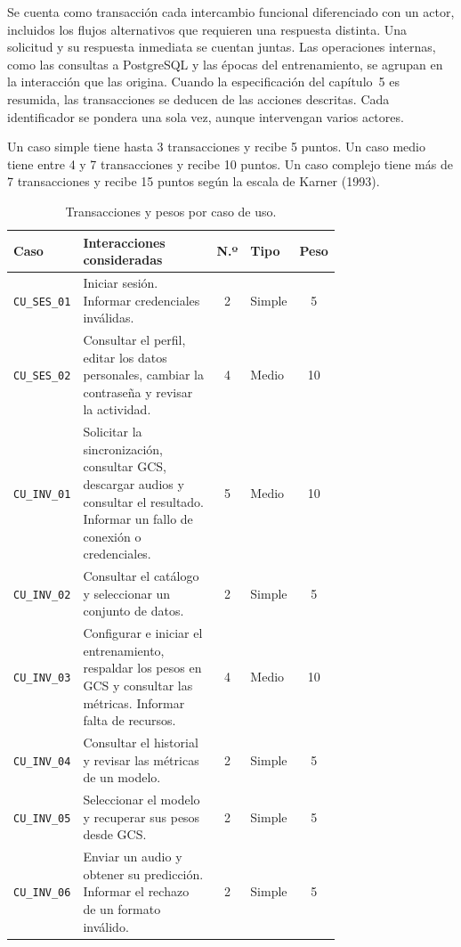 Se cuenta como transacción cada intercambio funcional diferenciado con
un actor, incluidos los flujos alternativos que requieren una respuesta
distinta. Una solicitud y su respuesta inmediata se cuentan juntas. Las
operaciones internas, como las consultas a PostgreSQL y las épocas del
entrenamiento, se agrupan en la interacción que las origina. Cuando la
especificación del capítulo~5 es resumida, las transacciones se deducen
de las acciones descritas. Cada identificador se pondera una sola vez,
aunque intervengan varios actores.

Un caso simple tiene hasta 3 transacciones y recibe 5 puntos. Un caso
medio tiene entre 4 y 7 transacciones y recibe 10 puntos. Un caso complejo
tiene más de 7 transacciones y recibe 15 puntos según la escala de
Karner (1993).

\begin{table}[!htbp]
    \centering
    \caption{Transacciones y pesos por caso de uso.}
    \label{tab:ucp-fama-casos}
    \small
    \setlength{\tabcolsep}{4pt}
    \renewcommand{\arraystretch}{1.10}
    \begin{tabular}{@{}p{0.18\linewidth}p{0.55\linewidth}clc@{}}
        \hline
        \textbf{Caso} & \textbf{Interacciones consideradas} &
        \textbf{N.º} & \textbf{Tipo} & \textbf{Peso} \\
        \hline
        \texttt{CU\_SES\_01} & Iniciar sesión. Informar credenciales inválidas. & 2 & Simple & 5 \\
        \texttt{CU\_SES\_02} & Consultar el perfil, editar los datos personales, cambiar la contraseña y revisar la actividad. & 4 & Medio & 10 \\
        \texttt{CU\_INV\_01} & Solicitar la sincronización, consultar GCS, descargar audios y consultar el resultado. Informar un fallo de conexión o credenciales. & 5 & Medio & 10 \\
        \texttt{CU\_INV\_02} & Consultar el catálogo y seleccionar un conjunto de datos. & 2 & Simple & 5 \\
        \texttt{CU\_INV\_03} & Configurar e iniciar el entrenamiento, respaldar los pesos en GCS y consultar las métricas. Informar falta de recursos. & 4 & Medio & 10 \\
        \texttt{CU\_INV\_04} & Consultar el historial y revisar las métricas de un modelo. & 2 & Simple & 5 \\
        \texttt{CU\_INV\_05} & Seleccionar el modelo y recuperar sus pesos desde GCS. & 2 & Simple & 5 \\
        \texttt{CU\_INV\_06} & Enviar un audio y obtener su predicción. Informar el rechazo de un formato inválido. & 2 & Simple & 5 \\

\end{tabular}
\end{table}
